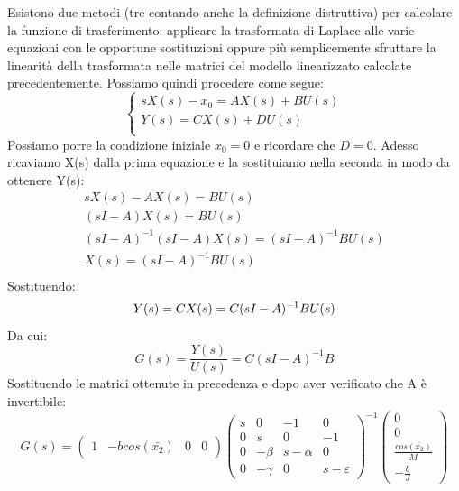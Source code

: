 Esistono due metodi (tre contando anche la definizione distruttiva) per calcolare la funzione di trasferimento: applicare la trasformata di Laplace alle varie equazioni con le opportune sostituzioni oppure più semplicemente sfruttare la linearità della trasformata nelle matrici del modello linearizzato calcolate precedentemente. Possiamo quindi procedere come segue:
\begin{displaymath}
\left\{
\begin{array}{l}
sX(s) - x_0= AX(s) + BU(s)\\
Y(s)=CX(s) + DU(s)\\
\end{array}
\right.
\end{displaymath}
Possiamo porre la condizione iniziale $x_0=0$ e ricordare che $D=0$.
Adesso ricaviamo X(s) dalla prima equazione e la sostituiamo nella seconda in modo da ottenere Y(s):
\begin{displaymath}
\begin{array}{cc}
sX(s) - AX(s) = BU(s) \\
(sI-A)X(s) = BU(s) \\
(sI-A)^{-1}(sI-A)X(s) = (sI-A)^{-1}BU(s) \\
X(s) = (sI-A)^{-1}BU(s) \\
\end{array}
\end{displaymath}
Sostituendo: \\
\begin{displaymath}
Y(s)=CX(s)=C(sI-A)^{-1}BU(s)\\
\end{displaymath}
Da cui:
\begin{displaymath}
G(s)=\frac{Y(s)}{U(s)}=C(sI-A)^{-1}B
\end{displaymath}
Sostituendo le matrici ottenute in precedenza e dopo aver verificato che A è invertibile:
\begin{displaymath}
G(s)=\left(\begin{array}{cccc}
1 & -bcos(\bar{x_{2}}) & 0 & 0\end{array}\right)\left(\begin{array}{cccc}
s & 0 & -1 & 0\\
0 & s & 0 & -1\\
0 & -\beta & s-\alpha & 0\\
0 & -\gamma & 0 & s-\varepsilon
\end{array}\right)^{-1}\left(\begin{array}{c}
0\\
0\\
\frac{cos(\bar{x_{2}})}{M}\\
-\frac{b}{J}
\end{array}\right)
\end{displaymath}
